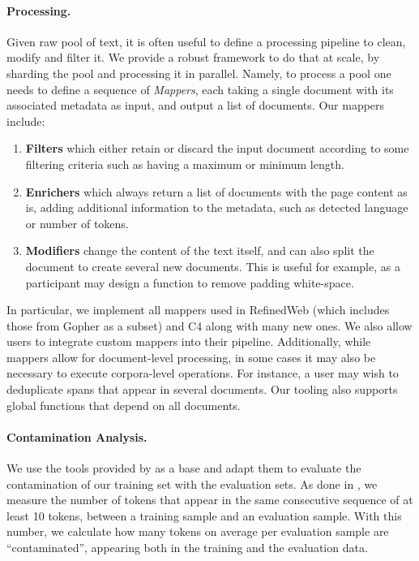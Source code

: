 \documentclass{article}
\begin{document}
\paragraph{Processing.}
Given raw pool of text, it is often useful to define a processing pipeline to clean, modify and filter it.
We provide a robust framework to do that at scale, by sharding the pool and processing it in parallel.
Namely, to process a pool one needs to define a sequence of \emph{Mappers}, each taking a single document with its associated metadata as input, and output a list of documents.
Our mappers include:
\begin{enumerate}
    \item \textbf{Filters} which either retain or discard the input document according to some filtering criteria such as having a maximum or minimum length.
    \item \textbf{Enrichers} which always return a list of documents with the page content as is, adding additional information to the metadata, such as detected language or number of tokens.
    \item \textbf{Modifiers} change the content of the text itself, and can also split the document to create several new documents.
    This is useful for example, as a participant may design a function to remove padding white-space.
\end{enumerate}
In particular, we implement all mappers used in RefinedWeb (which includes those from Gopher as a subset) and C4 along with many new ones. We also allow users to integrate custom mappers into their pipeline.
Additionally, while mappers allow for document-level processing, in some cases it may also be necessary to execute corpora-level operations.
For instance, a user may wish to deduplicate spans that appear in several documents.
Our tooling also supports global functions that depend on all documents.

\paragraph{Contamination Analysis.} We use the tools provided by \citet{Lee2021DeduplicatingTD} as a base and adapt them to evaluate the contamination of our training set with the evaluation sets.
As done in \citet{llama2}, we measure the number of tokens that appear in the same consecutive sequence of at least 10 tokens, between a training sample and an evaluation sample.
With this number, we calculate how many tokens on average per evaluation sample are ``contaminated'', appearing both in the training and the evaluation data.
\end{document}
